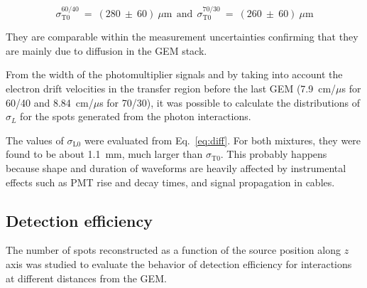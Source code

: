 \documentclass[a4paper,11pt]{article}
\begin{document}
$$
\sigma^{60/40}_{\mathrm{T0}}~=~(280~\pm~60)~\mu{\mathrm{m}}
{\mathrm{~~and~~}} 
\sigma^{70/30}_{\mathrm{T0}}~=~(260~\pm~60)~\mu{\mathrm{m}}
$$
 
 They are comparable within the measurement uncertainties confirming that they are mainly due to diffusion in the GEM stack.

From the width of the photomultiplier signals and by taking into account the electron drift velocities in the transfer region before the last GEM (7.9~cm/$\mu$s for 60/40 and	8.84~cm/$\mu$s for 70/30), it was possible to calculate the distributions of $\sigma_L$ for the spots generated from the photon interactions. 

%
The values of $\sigma_{\mathrm{L0}}$ were evaluated from Eq.~\ref{eq:diff}. For both mixtures, they were found to be about 1.1~mm, much larger than $\sigma_{\mathrm{T0}}$. This probably happens because shape and duration of waveforms are heavily affected by instrumental effects such as PMT rise and decay times, and signal propagation in cables. 



\subsection{Detection efficiency}
\label{cap:detect}

The number of spots reconstructed as a function of the source position along $z$ axis was studied to evaluate the behavior of detection efficiency for interactions at different distances from the GEM.
\end{document}
